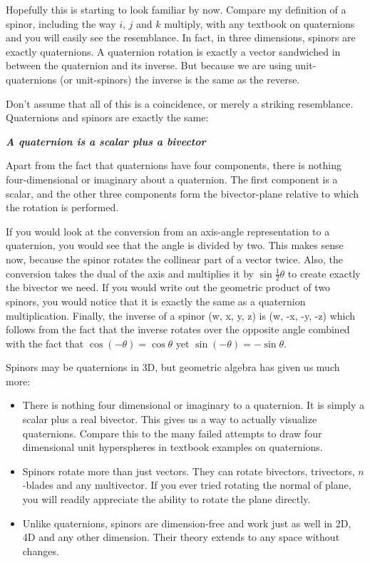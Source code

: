 \documentclass[10pt]{report}
\begin{document}
Hopefully this is starting to look familiar by now. Compare my
definition of a spinor, including the way $i$, $j$ and $k$
multiply, with any textbook on quaternions and you will easily see
the resemblance. In fact, in three dimensions, spinors are exactly
quaternions. A quaternion rotation is exactly a vector sandwiched
in between the quaternion and its inverse. But because we are
using unit-quaternions (or unit-spinors) the inverse is the same
as the reverse.

Don't assume that all of this is a coincidence, or merely a
striking resemblance. Quaternions and spinors are exactly the
same:
\begin{center}
\textbf{\emph{A quaternion is a scalar plus a bivector}}
\end{center}
Apart from the fact that quaternions have four components, there
is nothing four-dimensional or imaginary about a quaternion. The
first component is a scalar, and the other three components form
the bivector-plane relative to which the rotation is performed.

If you would look at the conversion from an axis-angle
representation to a quaternion, you would see that the angle is
divided by two. This makes sense now, because the spinor rotates
the collinear part of a vector twice. Also, the conversion takes
the dual of the axis and multiplies it by $\sin \frac{1}{2}
\theta$ to create exactly the bivector we need. If you would write
out the geometric product of two spinors, you would notice that it
is exactly the same as a quaternion multiplication. Finally, the
inverse of a spinor (w, x, y, z) is (w, -x, -y, -z) which follows
from the fact that the inverse rotates over the opposite angle
combined with the fact that $\cos(-\theta) = \cos \theta$ yet
$\sin(-\theta) = -\sin \theta$.

Spinors may be quaternions in 3D, but geometric algebra has given
us much more:
\begin{itemize}
    \item There is nothing four dimensional or imaginary to a
    quaternion. It is simply a scalar plus a real bivector. This
    gives us a way to actually visualize quaternions. Compare this
    to the many failed attempts to draw four dimensional unit
    hyperspheres in textbook examples on quaternions.
    \item Spinors rotate more than just vectors. They can rotate
    bivectors, trivectors, $n$-blades and any multivector. If you
    ever tried rotating the normal of plane, you will readily
    appreciate the ability to rotate the plane directly.
    \item Unlike quaternions, spinors are dimension-free and
    work just as well in 2D, 4D and any other dimension. Their
    theory extends to any space without changes.
\end{itemize}
\end{document}
